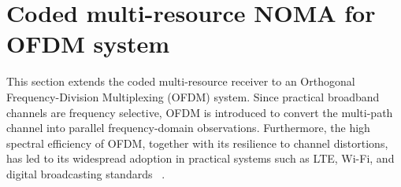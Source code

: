 \section{Coded multi-resource NOMA for OFDM system}
\label{ch:ofdm}

This section extends the coded multi-resource receiver to an Orthogonal Frequency-Division Multiplexing (OFDM) system. Since practical broadband channels are frequency selective, OFDM is introduced to convert the multi-path channel into parallel frequency-domain observations. Furthermore, the high spectral efficiency of OFDM, together with its resilience to channel distortions, has led to its widespread adoption in practical systems such as LTE, Wi-Fi, and digital broadcasting standards ~\cite{hwang2009ofdm}.


